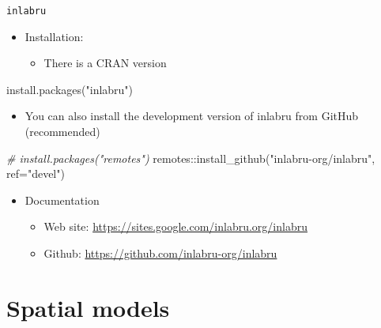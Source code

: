 \documentclass[
  ignorenonframetext,
]{beamer}
\newenvironment{Shaded}{\begin{snugshade}}{\end{snugshade}}
\newcommand{\AttributeTok}[1]{\textcolor[rgb]{0.77,0.63,0.00}{#1}}
\newcommand{\CommentTok}[1]{\textcolor[rgb]{0.56,0.35,0.01}{\textit{#1}}}
\newcommand{\FunctionTok}[1]{\textcolor[rgb]{0.00,0.00,0.00}{#1}}
\newcommand{\NormalTok}[1]{#1}
\newcommand{\SpecialCharTok}[1]{\textcolor[rgb]{0.00,0.00,0.00}{#1}}
\newcommand{\StringTok}[1]{\textcolor[rgb]{0.31,0.60,0.02}{#1}}
\providecommand{\tightlist}{%
  \setlength{\itemsep}{0pt}\setlength{\parskip}{0pt}}
\begin{document}
\begin{frame}[fragile]{\texttt{inlabru}}
\protect\hypertarget{inlabru}{}
\begin{itemize}
\item
  Installation:

  \begin{itemize}
  \tightlist
  \item
    There is a CRAN version
  \end{itemize}
\end{itemize}

\begin{Shaded}
\begin{Highlighting}[]
\FunctionTok{install.packages}\NormalTok{(}\StringTok{"inlabru"}\NormalTok{)}
\end{Highlighting}
\end{Shaded}

\begin{itemize}
\tightlist
\item
  You can also install the development version of inlabru from GitHub
  (recommended)
\end{itemize}

\begin{Shaded}
\begin{Highlighting}[]
\CommentTok{\# install.packages("remotes")}
\NormalTok{remotes}\SpecialCharTok{::}\FunctionTok{install\_github}\NormalTok{(}\StringTok{"inlabru{-}org/inlabru"}\NormalTok{,}
          \AttributeTok{ref=}\StringTok{"devel"}\NormalTok{)}
\end{Highlighting}
\end{Shaded}

\begin{itemize}
\item
  Documentation

  \begin{itemize}
  \tightlist
  \item
    Web site: \url{https://sites.google.com/inlabru.org/inlabru}
  \item
    Github: \url{https://github.com/inlabru-org/inlabru}
  \end{itemize}
\end{itemize}
\end{frame}

\hypertarget{spatial-models}{%
\section{Spatial models}\label{spatial-models}}
\end{document}
